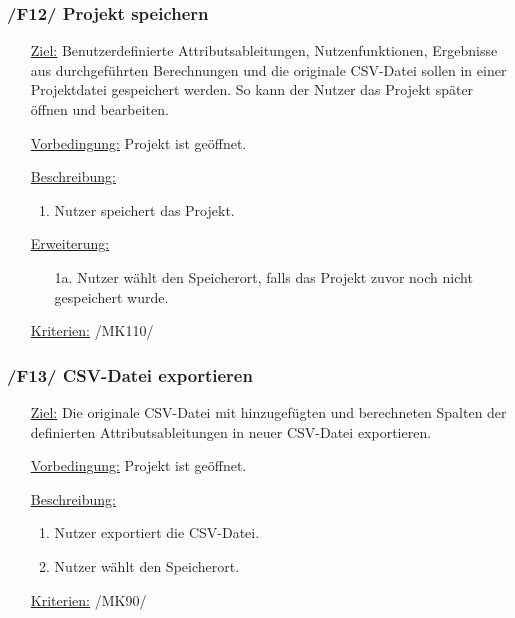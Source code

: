 \documentclass{article}
\begin{document}
\subsubsection*{\textbf{/F12/} Projekt speichern} \label{sec:f:Projekt speichern}
\begin{itemize}
    \item[\underline{Ziel:}] Benutzerdefinierte Attributsableitungen, Nutzenfunktionen, Ergebnisse aus durchgeführten Berechnungen und die originale CSV-Datei sollen in einer Projektdatei gespeichert werden. So kann der Nutzer das Projekt später öffnen und bearbeiten.
    \item[\underline{Vorbedingung:}] Projekt ist geöffnet.
    \item[\underline{Beschreibung:}] 
    \begin{enumerate}
        \item Nutzer speichert das Projekt.
    \end{enumerate}
    \item[\underline{Erweiterung:}]
    \begin{itemize}
        \item[1a.] Nutzer wählt den Speicherort, falls das Projekt zuvor noch nicht gespeichert wurde.
    \end{itemize}
    \item[\underline{Kriterien:}] /MK110/
\end{itemize}

\subsubsection*{\textbf{/F13/} CSV-Datei exportieren} \label{sec:f:CSV-Datei exportieren}
\begin{itemize}
    \item[\underline{Ziel:}] Die originale CSV-Datei mit hinzugefügten und berechneten Spalten der definierten Attributsableitungen in neuer CSV-Datei exportieren.
    \item[\underline{Vorbedingung:}] Projekt ist geöffnet.
    \item[\underline{Beschreibung:}] 
    \begin{enumerate}
        \item Nutzer exportiert die CSV-Datei.
        \item Nutzer wählt den Speicherort.
    \end{enumerate}
    \item[\underline{Kriterien:}] /MK90/
\end{itemize}
\end{document}
